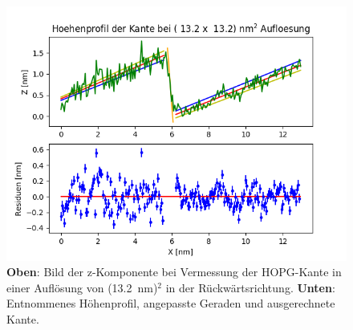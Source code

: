 \documentclass[12pt,a4paper]{article}
\begin{document}
\begin{figure}[H]
\includegraphics[scale=0.55]{Bilder/Anhang/Kante/Profil_Kante_0132_rueck.png}
\caption{\textbf{Oben}: Bild der z-Komponente bei Vermessung der HOPG-Kante in einer Auflösung von (\SI{13,2}{nm})$^2$ in der Rückwärtsrichtung. \textbf{Unten}: Entnommenes Höhenprofil, angepasste Geraden und ausgerechnete Kante.}
\end{figure}
\end{document}
